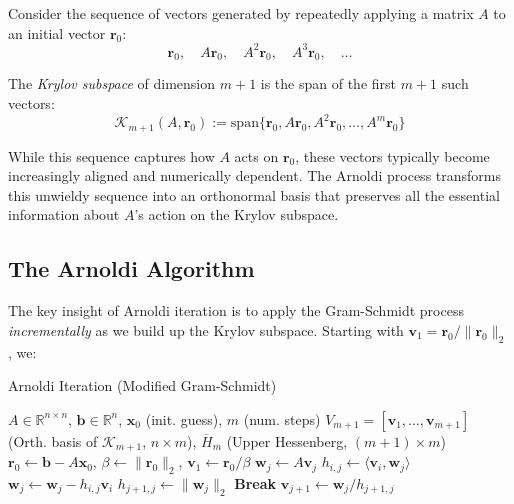 \documentclass[../../main.tex]{subfiles}
\begin{document}

Consider the sequence of vectors generated by repeatedly applying a matrix $A$ to an initial vector $\mathbf{r}_0$:
\[
  \mathbf{r}_0, \quad A\mathbf{r}_0, \quad A^2\mathbf{r}_0, \quad A^3\mathbf{r}_0, \quad \ldots
\]

The \emph{Krylov subspace} of dimension $m+1$ is the span of the first $m+1$ such vectors:
\[
  \mathcal{K}_{m+1}(A,\mathbf{r}_0) := \text{span}\{\mathbf{r}_0, A\mathbf{r}_0, A^2\mathbf{r}_0, \ldots, A^m\mathbf{r}_0\}
\]

While this sequence captures how $A$ acts on $\mathbf{r}_0$, these vectors typically become increasingly aligned and numerically dependent. The Arnoldi process transforms this unwieldy sequence into an orthonormal basis that preserves all the essential information about $A$'s action on the Krylov subspace.


\subsection{The Arnoldi Algorithm}
The key insight of Arnoldi iteration is to apply the Gram-Schmidt process \emph{incrementally} as we build up the Krylov subspace. Starting with $\mathbf{v}_1 = \mathbf{r}_0/\|\mathbf{r}_0\|_2$, we:


\begin{algorithm}[htbp]
  \caption{Arnoldi Iteration (Modified Gram-Schmidt)}
  \label{alg:arnoldi}
  \begin{algorithmic}
    \Require $A\in\mathbb{R}^{n\times n}$, $\mathbf{b}\in\mathbb{R}^n$, $\mathbf{x}_0$ (init. guess), $m$ (num. steps)
    \Ensure  $V_{m+1} = [\mathbf{v}_1, \ldots, \mathbf{v}_{m+1}]$ (Orth. basis of $\mathcal{K}_{m+1}$, $n\times m$), $\overline{H}_m$ (Upper Hessenberg, $(m+1)\times m$)
    \State $\mathbf{r}_0 \gets \mathbf{b} - A\mathbf{x}_0$, $\beta \gets \|\mathbf{r}_0\|_2$, $\mathbf{v}_1 \gets \mathbf{r}_0/\beta$
    \State $\mathbf{w}_j \gets A\mathbf{v}_j$
    \State $h_{i,j} \gets \langle\mathbf{v}_i, \mathbf{w}_j\rangle$
    \State $\mathbf{w}_j \gets \mathbf{w}_j - h_{i,j}\mathbf{v}_i$
    \EndFor
    \State $h_{j+1,j} \gets \|\mathbf{w}_j\|_2$
    \State \textbf{Break}
    \EndIf
    \State $\mathbf{v}_{j+1} \gets \mathbf{w}_j/h_{j+1,j}$
    \EndFor
  \end{algorithmic}
\end{algorithm}
\end{document}
